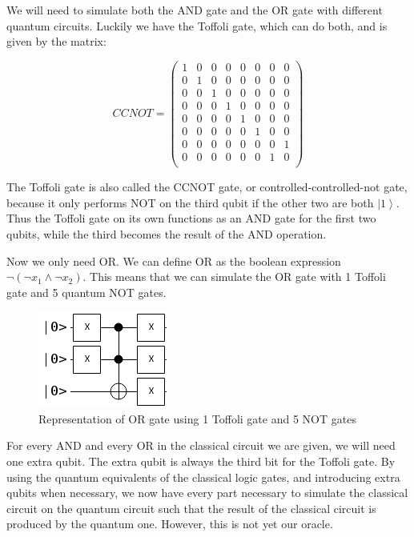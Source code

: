 \documentclass[11pt]{report}
\newcommand{\?}{\stackrel{?}{=}}
\begin{document}
We will need to simulate both the AND gate and the OR gate with different quantum circuits. Luckily we have the Toffoli gate, which can do both, and is given by the matrix:

$$CCNOT= \begin{pmatrix}
1 & 0 & 0 & 0 & 0 & 0 & 0 & 0 \\
0 & 1 & 0 & 0 & 0 & 0 & 0 & 0 \\
0 & 0 & 1 & 0 & 0 & 0 & 0 & 0 \\
0 & 0 & 0 & 1 & 0 & 0 & 0 & 0 \\
0 & 0 & 0 & 0 & 1 & 0 & 0 & 0 \\
0 & 0 & 0 & 0 & 0 & 1 & 0 & 0 \\
0 & 0 & 0 & 0 & 0 & 0 & 0 & 1 \\
0 & 0 & 0 & 0 & 0 & 0 & 1 & 0 \\
\end{pmatrix}$$

The Toffoli gate is also called the CCNOT gate, or controlled-controlled-not gate, because it only performs NOT on the third qubit if the other two are both $\left | 1 \right \rangle$. Thus the Toffoli gate on its own functions as an AND gate for the first two qubits, while the third becomes the result of the AND operation.

Now we only need OR. We can define OR as the boolean expression $\neg (\neg x_{1} \land \neg x_{2})$. This means that we can simulate the OR gate with 1 Toffoli gate and 5 quantum NOT gates.

\begin{figure}[!ht]
    \centering
    \includegraphics[scale=0.6]{resources/images/OR.png}
    \caption{Representation of OR gate using 1 Toffoli gate and 5 NOT gates}
    \label{fig:awesome_image}
\end{figure} 

For every AND and every OR in the classical circuit we are given, we will need one extra qubit. The extra qubit is always the third bit for the Toffoli gate. By using the quantum equivalents of the classical logic gates, and introducing extra qubits when necessary, we now have every part necessary to simulate the classical circuit on the quantum circuit such that the result of the classical circuit is produced by the quantum one. However, this is not yet our oracle.
\end{document}

